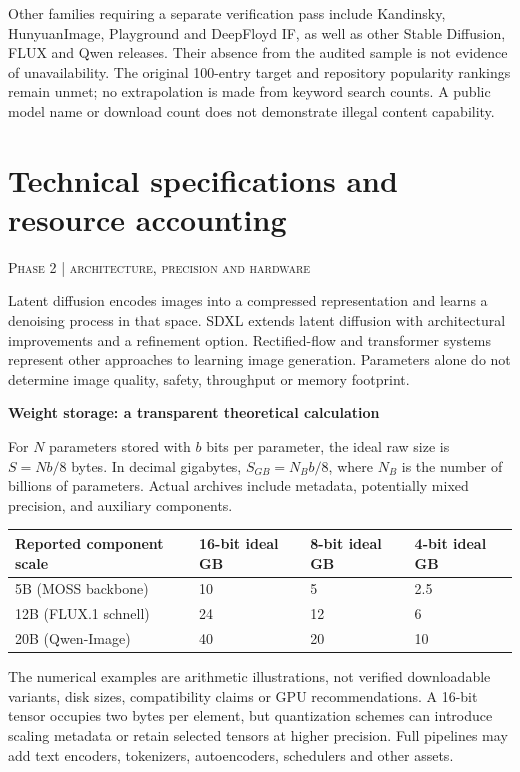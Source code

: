 \documentclass[10pt,a4paper]{article}
\newcommand{\sect}[2]{\Needspace{6\baselineskip}\section{#1}\textcolor{muted}{\small\textsc{#2}}\par\vspace{2mm}}
\newcommand{\sub}[1]{\vspace{1mm}\textbf{#1}\par}
\begin{document}
Other families requiring a separate verification pass include Kandinsky, HunyuanImage, Playground and DeepFloyd IF, as well as other Stable Diffusion, FLUX and Qwen releases. Their absence from the audited sample is not evidence of unavailability. The original 100-entry target and repository popularity rankings remain unmet; no extrapolation is made from keyword search counts. A public model name or download count does not demonstrate illegal content capability.


\sect{Technical specifications and resource accounting}{Phase 2 | architecture, precision and hardware}

Latent diffusion encodes images into a compressed representation and learns a denoising process in that space. SDXL extends latent diffusion with architectural improvements and a refinement option. Rectified-flow and transformer systems represent other approaches to learning image generation. Parameters alone do not determine image quality, safety, throughput or memory footprint. \cite{ldm,sdxl,flux}


\sub{Weight storage: a transparent theoretical calculation}

For $N$ parameters stored with $b$ bits per parameter, the ideal raw size is $S=N b/8$ bytes. In decimal gigabytes, $S_{GB}=N_{B}b/8$, where $N_B$ is the number of billions of parameters. Actual archives include metadata, potentially mixed precision, and auxiliary components.\par
\begin{center}\small\begin{tabularx}{\linewidth}{@{}YYYY@{}}\toprule
\textbf{Reported component scale} & \textbf{16-bit ideal GB} & \textbf{8-bit ideal GB} & \textbf{4-bit ideal GB}\\\midrule
5B (MOSS backbone) & 10 & 5 & 2.5\\
12B (FLUX.1 schnell) & 24 & 12 & 6\\
20B (Qwen-Image) & 40 & 20 & 10\\\bottomrule\end{tabularx}\end{center}

The numerical examples are arithmetic illustrations, not verified downloadable variants, disk sizes, compatibility claims or GPU recommendations. A 16-bit tensor occupies two bytes per element, but quantization schemes can introduce scaling metadata or retain selected tensors at higher precision. Full pipelines may add text encoders, tokenizers, autoencoders, schedulers and other assets. \cite{memory}
\end{document}
